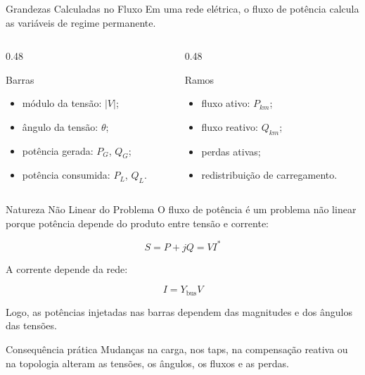 \documentclass[aspectratio=169,11pt]{beamer}
\begin{document}
\begin{frame}{Grandezas Calculadas no Fluxo}
  Em uma rede elétrica, o fluxo de potência calcula as variáveis de regime permanente.

  \begin{columns}[T]
    \begin{column}{0.48\textwidth}
      \begin{block}{Barras}
        \begin{itemize}
          \item módulo da tensão: $|V|$;
          \item ângulo da tensão: $\theta$;
          \item potência gerada: $P_G$, $Q_G$;
          \item potência consumida: $P_L$, $Q_L$.
        \end{itemize}
      \end{block}
    \end{column}

    \begin{column}{0.48\textwidth}
      \begin{block}{Ramos}
        \begin{itemize}
          \item fluxo ativo: $P_{km}$;
          \item fluxo reativo: $Q_{km}$;
          \item perdas ativas;
          \item redistribuição de carregamento.
        \end{itemize}
      \end{block}
    \end{column}
  \end{columns}
\end{frame}

\begin{frame}{Natureza Não Linear do Problema}
  O fluxo de potência é um problema não linear porque potência depende do produto entre tensão e corrente:

  \[
    S = P + jQ = V I^{*}
  \]

  A corrente depende da rede:

  \[
    I = Y_{\text{bus}} V
  \]

  Logo, as potências injetadas nas barras dependem das magnitudes e dos ângulos das tensões.

  \begin{block}{Consequência prática}
    Mudanças na carga, nos taps, na compensação reativa ou na topologia alteram as tensões, os ângulos, os fluxos e as perdas.
  \end{block}
\end{frame}
\end{document}
